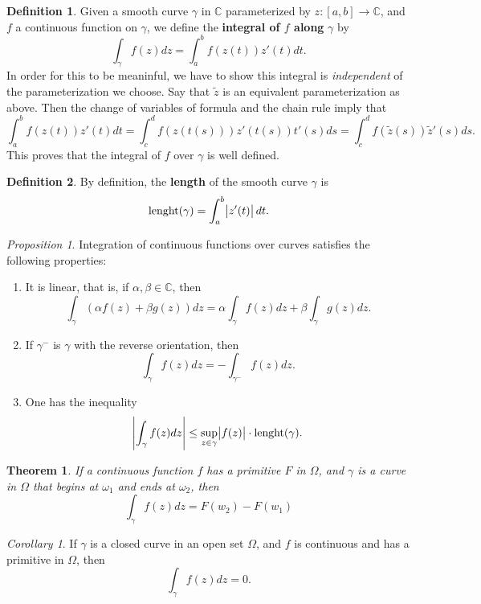 \documentclass{article}
\newtheorem{theorem}{Theorem}
\theoremstyle{definition}
\newtheorem{definition}{Definition}[section]
\theoremstyle{remark}
\newtheorem{corollary}{Corollary}[theorem]
\newtheorem{prop}{Proposition}
\begin{document}
    \begin{definition}
        Given a smooth curve $\gamma$ in $\mathbb{C}$ parameterized by $z:[a,b]\to\mathbb{C}$, and $f$ a continuous function on $\gamma$,
        we define the \textbf{integral of $f$ along} $\gamma$ by
        \[ \int_{\gamma} f(z)dz = \int_a^b f(z(t))z'(t)dt. \]
        In order for this to be meaninful, we have to show this integral is \textit{independent} of the parameterization we choose.
        Say that $\tilde{z}$ is an equivalent parameterization as above. Then the change of variables of formula and the chain
        rule imply that
        \[ \int_a^b f(z(t))z'(t)dt = \int_c^d f(z(t(s)))z'(t(s))t'(s)ds = \int_c^d f(\tilde{z}(s))\tilde{z}'(s)ds. \]
        This proves that the integral of $f$ over $\gamma$ is well defined.
    \end{definition}

    \begin{definition}
        By definition, the \textbf{length} of the smooth curve $\gamma$ is
        \[ \text{lenght}(\gamma) = \int_a^b \abs{z'(t)}dt.\]
    \end{definition}

    \begin{prop}
        Integration of continuous functions over curves satisfies the following properties:
        \begin{enumerate}
            \item It is linear, that is, if $\alpha,\beta\in\mathbb{C}$, then
                \[ \int_{\gamma} (\alpha f(z)+\beta g(z))dz = \alpha\int_{\gamma} f(z)dz + \beta\int_{\gamma} g(z)dz.\]
            \item If $\gamma^{-}$ is $\gamma$ with the reverse orientation, then
                \[ \int_{\gamma} f(z)dz = -\int_{\gamma^{-}} f(z)dz. \]
            \item One has the inequality
                \[ \abs{\int_{\gamma} f(z)dz} \leq \sup_{z\in\gamma}\abs{f(z)}\cdot \text{lenght}(\gamma).\]
        \end{enumerate}
    \end{prop}

    \begin{theorem}
        If a continuous function $f$ has a primitive $F$ in $\Omega$, and $\gamma$ is a curve in $\Omega$ that begins at $\omega_1$
        and ends at $\omega_2$, then
        \[ \int_{\gamma} f(z)dz = F(w_2) - F(w_1) \]
    \end{theorem}

    \begin{corollary}
        If $\gamma$ is a closed curve in an open set $\Omega$, and $f$ is continuous and has a primitive in $\Omega$, then
        \[ \int_{\gamma} f(z)dz = 0. \]
    \end{corollary}
\end{document}
